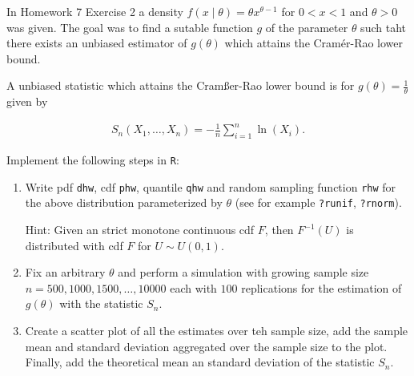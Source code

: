 
\begin{exercise}

In Homework 7 Exercise 2 a density $f(x \mid \theta) = \theta x^{\theta - 1}$ for $0 < x < 1$ and $\theta > 0$ was given.
The goal was to find a sutable function $g$ of the parameter $\theta$ such taht there exists an unbiased estimator of $g(\theta)$ which attains the Cramér-Rao lower bound.

A unbiased statistic which attains the Cramßer-Rao lower bound is for $g(\theta) = \frac{1}{\theta}$ given by

\begin{align*}
    S_n(X_1, \dots, X_n)
    =
    -\frac{1}{n}
    \sum_{i=1}^n
        \ln(X_i).
\end{align*}

Implement the following steps in \texttt R:

\begin{enumerate}

    \item Write pdf \texttt{dhw}, cdf \texttt{phw}, quantile \texttt{qhw} and random sampling function \texttt{rhw} for the above distribution parameterized by $\theta$ (see for example \texttt{?runif}, \texttt{?rnorm}).

    \begin{itshape}
        Hint:
        Given an strict monotone continuous cdf $F$, then $F^{-1}(U)$ is distributed with cdf $F$ for $U \sim \mathit U(0, 1)$.
    \end{itshape}

    \item Fix an arbitrary $\theta$ and perform a simulation with growing sample size $n = 500, 1000, 1500, \dots, 10000$ each  with $100$ replications for the estimation of $g(\theta)$ with the statistic $S_n$.

    \item Create a scatter plot of all the estimates over teh sample size, add the sample mean and standard deviation aggregated over the sample size to the plot.
    Finally, add the theoretical mean an standard deviation of the statistic $S_n$.

\end{enumerate}

\end{exercise}


